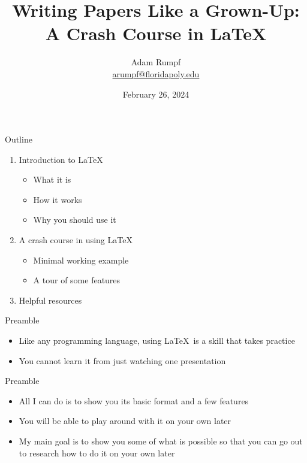 \documentclass{beamer} %
\title{Writing Papers Like a Grown-Up:\\ A Crash Course in \LaTeX}
\author{Adam Rumpf\\{\footnotesize \href{mailto:arumpf@floridapoly.edu}{arumpf@floridapoly.edu}}}
\institute{Florida Polytechnic University\\Department of Applied Mathematics}
\date{February 26, 2024}
\begin{document}
\begin{frame}

\titlepage

\end{frame}

\begin{frame}{Outline}

\begin{enumerate}
	\item Introduction to \LaTeX
	\begin{itemize}
		\item What it is
		\item How it works
		\item Why you should use it
	\end{itemize}
	\item A crash course in using \LaTeX
	\begin{itemize}
		\item Minimal working example
		\item A tour of some features
	\end{itemize}
	\item Helpful resources
\end{enumerate}

\end{frame}

\begin{frame}{Preamble}

\begin{itemize}
	\item Like any programming language, using \LaTeX\ is a skill that takes practice
	\item You cannot learn it from just watching one presentation
\end{itemize}

\end{frame}

\begin{frame}{Preamble}

\begin{itemize}
	\item All I can do is to show you its basic format and a few features
	\item You will be able to play around with it on your own later
	\item My main goal is to show you some of what is possible so that you can go out to research how to do it on your own later
\end{itemize}

\end{frame}
\end{document}
